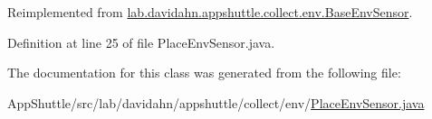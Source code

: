 \-Reimplemented from \hyperlink{classlab_1_1davidahn_1_1appshuttle_1_1collect_1_1env_1_1_base_env_sensor_a80cd864cc7e21f338ea4197665ee268e}{lab.\-davidahn.\-appshuttle.\-collect.\-env.\-Base\-Env\-Sensor}.



\-Definition at line 25 of file \-Place\-Env\-Sensor.\-java.



\-The documentation for this class was generated from the following file\-:\begin{DoxyCompactItemize}
\item 
\-App\-Shuttle/src/lab/davidahn/appshuttle/collect/env/\hyperlink{_place_env_sensor_8java}{\-Place\-Env\-Sensor.\-java}\end{DoxyCompactItemize}
